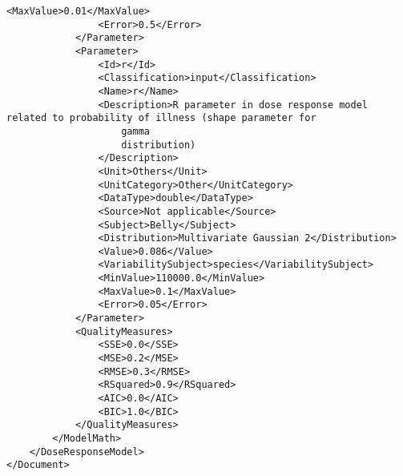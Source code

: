 \begin{lstlisting}[language=RAKIP, caption={Example of DoseResponseModel}]
                <MaxValue>0.01</MaxValue>
                <Error>0.5</Error>
            </Parameter>
            <Parameter>
                <Id>r</Id>
                <Classification>input</Classification>
                <Name>r</Name>
                <Description>R parameter in dose response model related to probability of illness (shape parameter for
                    gamma
                    distribution)
                </Description>
                <Unit>Others</Unit>
                <UnitCategory>Other</UnitCategory>
                <DataType>double</DataType>
                <Source>Not applicable</Source>
                <Subject>Belly</Subject>
                <Distribution>Multivariate Gaussian 2</Distribution>
                <Value>0.086</Value>
                <VariabilitySubject>species</VariabilitySubject>
                <MinValue>110000.0</MinValue>
                <MaxValue>0.1</MaxValue>
                <Error>0.05</Error>
            </Parameter>
            <QualityMeasures>
                <SSE>0.0</SSE>
                <MSE>0.2</MSE>
                <RMSE>0.3</RMSE>
                <RSquared>0.9</RSquared>
                <AIC>0.0</AIC>
                <BIC>1.0</BIC>
            </QualityMeasures>
        </ModelMath>
    </DoseResponseModel>
</Document>
\end{lstlisting}
